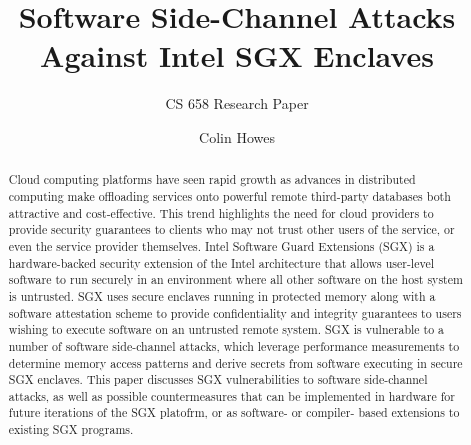 \documentclass[sigconf]{acmart}
\begin{document}
\title{Software Side-Channel Attacks Against Intel SGX Enclaves}
\subtitle{CS 658 Research Paper}


\author{Colin Howes}

\begin{abstract}

Cloud computing platforms have seen rapid growth as advances in distributed computing make offloading services onto powerful remote third-party databases both attractive and cost-effective. This trend highlights the need for cloud providers to provide security guarantees to clients who may not trust other users of the service, or even the service provider themselves. Intel Software Guard Extensions (SGX) is a hardware-backed security extension of the Intel architecture that allows user-level software to run securely in an environment where all other software on the host system is untrusted. SGX uses secure enclaves running in protected memory along with a software attestation scheme to provide confidentiality and integrity guarantees to users wishing to execute software on an untrusted remote system. SGX is vulnerable to a number of software side-channel attacks, which leverage performance measurements to determine memory access patterns and derive secrets from software executing in secure SGX enclaves. This paper discusses SGX vulnerabilities to software side-channel attacks, as well as possible countermeasures that can be implemented in hardware for future iterations of the SGX platofrm, or as software- or compiler- based extensions to existing SGX programs.

\end{abstract}

\maketitle




 
\end{document}
